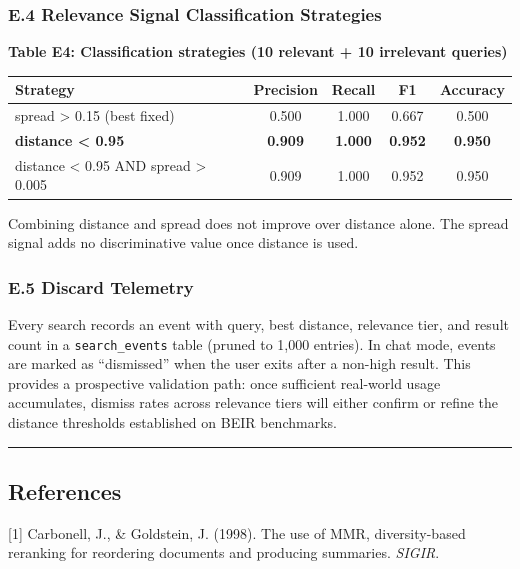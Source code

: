 \documentclass[
  11pt]{article}
\newcounter{none} %
\begin{document}
\subsubsection{E.4 Relevance Signal Classification Strategies}\label{e.4-relevance-signal-classification-strategies}

\textbf{Table E4: Classification strategies (10 relevant + 10 irrelevant queries)}

{\def\LTcaptype{none} %
\begin{longtable}[]{@{}lcccc@{}}
\toprule\noalign{}
Strategy & Precision & Recall & F1 & Accuracy \\
\midrule\noalign{}
\endhead
\bottomrule\noalign{}
\endlastfoot
spread \textgreater{} 0.15 (best fixed) & 0.500 & 1.000 & 0.667 & 0.500 \\
\textbf{distance \textless{} 0.95} & \textbf{0.909} & \textbf{1.000} & \textbf{0.952} & \textbf{0.950} \\
distance \textless{} 0.95 AND spread \textgreater{} 0.005 & 0.909 & 1.000 & 0.952 & 0.950 \\
\end{longtable}
}

Combining distance and spread does not improve over distance alone. The spread signal adds no discriminative value once distance is used.

\subsubsection{E.5 Discard Telemetry}\label{e.5-discard-telemetry}

Every search records an event with query, best distance, relevance tier, and result count in a \texttt{search\_events} table (pruned to 1,000 entries). In chat mode, events are marked as ``dismissed'' when the user exits after a non-high result. This provides a prospective validation path: once sufficient real-world usage accumulates, dismiss rates across relevance tiers will either confirm or refine the distance thresholds established on BEIR benchmarks.

\begin{center}\rule{0.5\linewidth}{0.5pt}\end{center}

\subsection{References}\label{references}

{[}1{]} Carbonell, J., \& Goldstein, J. (1998). The use of MMR, diversity-based reranking for reordering documents and producing summaries. \emph{SIGIR}.
\end{document}
